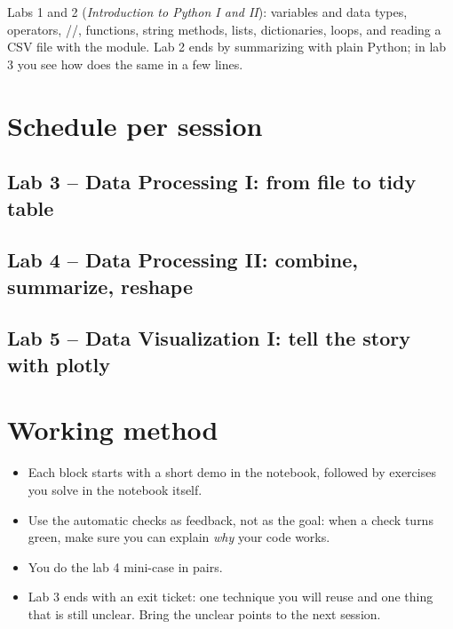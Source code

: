 \documentclass[11pt,a4paper]{article}
\begin{document}
Labs 1 and 2 (\emph{Introduction to Python I and II}): variables and data
types, operators, //, functions, string
methods, lists, dictionaries, loops, and reading a CSV file with the
 module. Lab 2 ends by summarizing  with
plain Python; in lab 3 you see how  does the same in a few
lines.





\section{Schedule per session}

\subsection{Lab 3 -- Data Processing I: from file to tidy table}


\subsection{Lab 4 -- Data Processing II: combine, summarize, reshape}


\subsection{Lab 5 -- Data Visualization I: tell the story with plotly}


\section{Working method}

\begin{itemize}
  \item Each block starts with a short demo in the notebook, followed by
        exercises you solve in the notebook itself.
  \item Use the automatic checks as feedback, not as the goal: when a
        check turns green, make sure you can explain \emph{why} your code
        works.
  \item You do the lab 4 mini-case in pairs.
  \item Lab 3 ends with an exit ticket: one technique you will reuse and
        one thing that is still unclear. Bring the unclear points to the
        next session.
\end{itemize}
\end{document}
